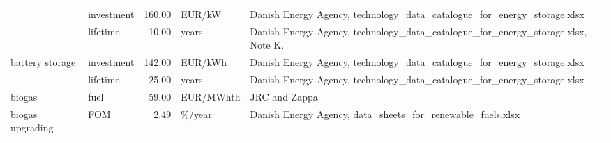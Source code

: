 \begin{longtable}{p{5cm}p{3cm}rp{3cm}p{11cm}}
                      & investment &         160.00 &                            EUR/kW &                                                                                                                                                                                                                                                              Danish Energy Agency, technology\_data\_catalogue\_for\_energy\_storage.xlsx \\
                      & lifetime &          10.00 &                             years &                                                                                                                                                                                                                                                     Danish Energy Agency, technology\_data\_catalogue\_for\_energy\_storage.xlsx, Note K. \\
battery storage & investment &         142.00 &                           EUR/kWh &                                                                                                                                                                                                                                                              Danish Energy Agency, technology\_data\_catalogue\_for\_energy\_storage.xlsx \\
                      & lifetime &          25.00 &                             years &                                                                                                                                                                                                                                                              Danish Energy Agency, technology\_data\_catalogue\_for\_energy\_storage.xlsx \\
biogas & fuel &          59.00 &                         EUR/MWhth &                                                                                                                                                                                                                                                                                                                        JRC and Zappa \\
biogas upgrading & FOM &           2.49 &                            \%/year &                                                                                                                                                                                                                                                                           Danish Energy Agency, data\_sheets\_for\_renewable\_fuels.xlsx \\

\end{longtable}
